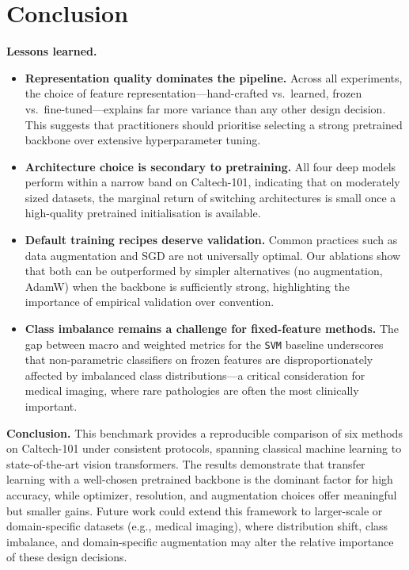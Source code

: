 \section{Conclusion}

\textbf{Lessons learned.}

\begin{itemize}
  \item \textbf{Representation quality dominates the pipeline.} Across all experiments, the choice of feature representation---hand-crafted vs.\ learned, frozen vs.\ fine-tuned---explains far more variance than any other design decision. This suggests that practitioners should prioritise selecting a strong pretrained backbone over extensive hyperparameter tuning.

  \item \textbf{Architecture choice is secondary to pretraining.} All four deep models perform within a narrow band on Caltech-101, indicating that on moderately sized datasets, the marginal return of switching architectures is small once a high-quality pretrained initialisation is available.

  \item \textbf{Default training recipes deserve validation.} Common practices such as data augmentation and SGD are not universally optimal. Our ablations show that both can be outperformed by simpler alternatives (no augmentation, AdamW) when the backbone is sufficiently strong, highlighting the importance of empirical validation over convention.

  \item \textbf{Class imbalance remains a challenge for fixed-feature methods.} The gap between macro and weighted metrics for the \texttt{SVM} baseline underscores that non-parametric classifiers on frozen features are disproportionately affected by imbalanced class distributions---a critical consideration for medical imaging, where rare pathologies are often the most clinically important.
\end{itemize}

\textbf{Conclusion.}
This benchmark provides a reproducible comparison of six methods on Caltech-101 under consistent protocols, spanning classical machine learning to state-of-the-art vision transformers. The results demonstrate that transfer learning with a well-chosen pretrained backbone is the dominant factor for high accuracy, while optimizer, resolution, and augmentation choices offer meaningful but smaller gains. Future work could extend this framework to larger-scale or domain-specific datasets (e.g., medical imaging), where distribution shift, class imbalance, and domain-specific augmentation may alter the relative importance of these design decisions.
